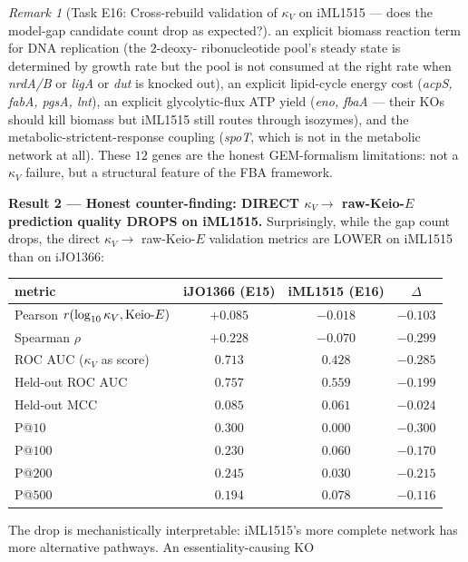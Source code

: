 \documentclass[11pt,a4paper]{article}
\theoremstyle{plain}
\theoremstyle{definition}
\theoremstyle{remark}
\newtheorem{remark}[theorem]{Remark}
\begin{document}
\begin{remark}[Task E16: Cross-rebuild validation of $\kappa_V$ on iML1515
--- does the model-gap candidate count drop as expected?]
an explicit biomass reaction term for DNA replication (the $2$-deoxy-
ribonucleotide pool's steady state is determined by growth rate but the
pool is not consumed at the right rate when \emph{nrdA/B} or \emph{ligA}
or \emph{dut} is knocked out), an explicit lipid-cycle energy cost
(\emph{acpS, fabA, pgsA, lnt}), an explicit glycolytic-flux ATP yield
(\emph{eno, fbaA} --- their KOs should kill biomass but iML1515 still
routes through isozymes), and the metabolic-strictent-response
coupling (\emph{spoT}, which is not in the metabolic network at all).
These $12$ genes are the honest GEM-formalism limitations: not a
$\kappa_V$ failure, but a structural feature of the FBA framework.

\textbf{Result 2 --- Honest counter-finding: DIRECT $\kappa_V \to$
raw-Keio-$E$ prediction quality DROPS on iML1515.} Surprisingly,
while the gap count drops, the direct $\kappa_V \to$ raw-Keio-$E$
validation metrics are LOWER on iML1515 than on iJO1366:
\begin{center}
\begin{tabular}{lccc}
\hline
metric & iJO1366 (E15) & iML1515 (E16) & $\Delta$ \\
\hline
Pearson $r(\log_{10} \kappa_V, \textnormal{Keio-}E)$ & $+0.085$ & $-0.018$ & $-0.103$ \\
Spearman $\rho$                                       & $+0.228$ & $-0.070$ & $-0.299$ \\
ROC AUC ($\kappa_V$ as score)                        & $0.713$  & $0.428$  & $-0.285$ \\
Held-out ROC AUC                                      & $0.757$  & $0.559$  & $-0.199$ \\
Held-out MCC                                          & $0.085$  & $0.061$  & $-0.024$ \\
P@$10$                                                & $0.300$  & $0.000$  & $-0.300$ \\
P@$100$                                               & $0.230$  & $0.060$  & $-0.170$ \\
P@$200$                                               & $0.245$  & $0.030$  & $-0.215$ \\
P@$500$                                               & $0.194$  & $0.078$  & $-0.116$ \\
\hline
\end{tabular}
\end{center}
The drop is mechanistically interpretable: iML1515's more complete
network has more alternative pathways. An essentiality-causing KO

\end{remark}
\end{document}
